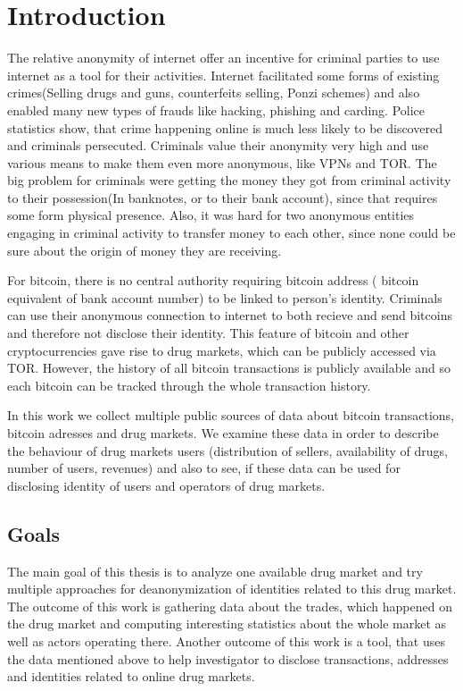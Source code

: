 \documentclass[
  digital, %
  table,   %
  lof,     %
  lot,     %
  oneside
]{fithesis3}
\begin{document}
\chapter{Introduction}

The relative anonymity of internet offer an incentive for criminal parties to use internet as a tool for their activities.
Internet facilitated some forms of existing crimes(Selling drugs and guns,
counterfeits selling, Ponzi schemes) and also enabled many new types of frauds like hacking, phishing and carding.
Police statistics show, that crime happening online is much less likely to be discovered and criminals persecuted.
Criminals value their anonymity very high and use various means to make them even more anonymous,
like VPNs and TOR.
The big problem for criminals were getting the money they got from criminal activity to their possession(In banknotes,
or to their bank account), since that requires some form physical presence.
Also, it was hard for two anonymous entities engaging in criminal activity to transfer money to each other,
since none could be sure about the origin of money they are receiving.

For bitcoin, there is no central authority requiring bitcoin address
( bitcoin equivalent of bank account number) to be linked to person's identity.
Criminals can use their anonymous connection to internet to both recieve and send bitcoins and therefore not disclose their identity.
This feature of bitcoin and other cryptocurrencies gave rise to drug markets, which can be publicly accessed via TOR. However,
the history of all bitcoin transactions is publicly available and so each bitcoin can be tracked through the whole transaction history.

In this work we collect multiple public sources of data about bitcoin transactions, bitcoin adresses and drug markets.
We examine these data in order to describe the behaviour of drug markets users (distribution of sellers, availability of drugs,
number of users, revenues) and also to see, if these data can be used for disclosing identity of users and operators of drug markets.

\section{Goals}

The main goal of this thesis is to analyze one available drug market 
and try multiple approaches for deanonymization of identities related to this drug market.
The outcome of this work is gathering data about the trades, which happened on the drug market and
 computing interesting statistics about the whole market as well as actors operating there.
Another outcome of this work is a tool, that uses the data mentioned above to help investigator to disclose transactions,
addresses and identities related to online drug markets.
\end{document}
